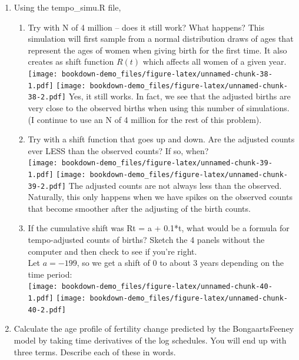 \documentclass[]{book}
\providecommand{\tightlist}{%
  \setlength{\itemsep}{0pt}\setlength{\parskip}{0pt}}
\begin{document}
\begin{enumerate}
\def\labelenumi{\arabic{enumi}.}
\item
  Using the tempo\_simu.R file,

  \begin{enumerate}
  \def\labelenumii{\alph{enumii}.}
  \tightlist
  \item
    Try with N of 4 million -- does it still work? What happens?
    This simulation will first sample from a normal distribution draws of ages that represent the ages of women when giving birth for the first time. It also creates as shift function \(R(t)\) which affects all women of a given year.
    \texttt{[image: bookdown-demo\_files/figure-latex/unnamed-chunk-38-1.pdf]} \texttt{[image: bookdown-demo\_files/figure-latex/unnamed-chunk-38-2.pdf]}
    Yes, it still works. In fact, we see that the adjusted births are very close to the observed births when using this number of simulations. (I continue to use an N of 4 million for the rest of this problem).\\
  \item
    Try with a shift function that goes up and down. Are the adjusted counts ever LESS than the observed counts? If so, when?\\
    \texttt{[image: bookdown-demo\_files/figure-latex/unnamed-chunk-39-1.pdf]} \texttt{[image: bookdown-demo\_files/figure-latex/unnamed-chunk-39-2.pdf]}
    The adjusted counts are not always less than the observed. Naturally, this only happens when we have spikes on the observed counts that become smoother after the adjusting of the birth counts.\\
  \item
    If the cumulative shift was Rt = a + 0.1*t, what would be a formula for tempo-adjusted counts of births? Sketch the 4 panels without the computer and then check to see if you're right.\\
    Let \(a = -199\), so we get a shift of 0 to about 3 years depending on the time period:\\
    \texttt{[image: bookdown-demo\_files/figure-latex/unnamed-chunk-40-1.pdf]} \texttt{[image: bookdown-demo\_files/figure-latex/unnamed-chunk-40-2.pdf]}
  \end{enumerate}
\item
  Calculate the age profile of fertility change predicted by the BongaartsFeeney model by taking time derivatives of the log schedules. You will end up with three terms. Describe each of these in words.\\
  \[\begin{aligned}

\end{aligned}\]
\end{enumerate}
\end{document}
